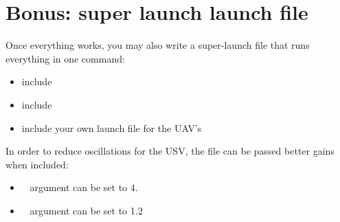 \documentclass{ecnreport}
\begin{document}
\section{Bonus: super launch launch file}

Once everything works, you may also write a super-launch file that runs everything in one command:
\begin{itemize}
 \item include 
 \item include 
 \item include your own launch file for the UAV's
\end{itemize}

In order to reduce oscillations for the USV, the  file can be passed better gains when included:
\begin{itemize}
 \item ~ argument can be set to 4.
 \item ~ argument can be set to 1.2
\end{itemize}
\end{document}
